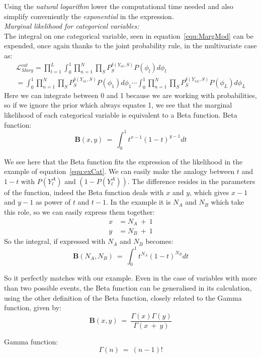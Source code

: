 \documentclass[twocolumn]{article}
\begin{document}
Using the \emph{natural logarithm} lower the computational time needed and also simplify conveniently the \emph{exponential} in the expression.\\
\emph{Marginal likelihood for categorical variables:}\\
The integral on one categorical variable, seen in equation~\ref{equ:MargMod} can be expended, once again thanks to the joint probability rule, in the multivariate case as:
\begin{align}
    \mathcal{L}_{Marg}^{cat} = \prod_{l=1}^L\int_0^1\prod_{n=1}^N\prod_SP_{S}^{\delta(Y_{nl},S)}P(\phi_l)d\phi_l\nonumber\\
    = \int_0^1\prod_{n=1}^N\prod_SP_{S}^{\delta(Y_{n1},S)}P(\phi_1)d\phi_1\cdots\int_0^1\prod_{n=1}^N\prod_SP_{S}^{\delta(Y_{nL},S)}P(\phi_L)d\phi_L
    \label{equ:LmargCat}
\end{align}
Here we can integrate between 0 and 1 because we are working with probabilities, so if we ignore the prior which always equates 1, we see that the marginal likelihood of each categorical variable is equivalent to a Beta function.
Beta function:\\
$$\textbf{B}(x,y)\ =\ \int_0^1t^{x-1}(1-t)^{y-1}dt$$


We see here that the Beta function fits the expression of the likelihood in the example of equation~\ref{equ:exCat}.
We can easily make the analogy between $t$ and $1-t$ with $P(Y_{l}^A)$ and $(1-P(Y_{l}^A))$.
The difference resides in the parameters of the function, indeed the Beta function deals with $x$ and $y$, which gives $x-1$ and $y-1$ as power of $t$ and $t-1$. In the example it is $N_A$ and $N_B$ which take this role, so we can easily express them together:
\begin{align}
    x &= N_A\ +\ 1\\
    y &= N_B\ +\ 1
\end{align}
So the integral, if expressed with $N_A$ and $N_B$ becomes:\\
$$\textbf{B}(N_A,N_B)\ =\ \int_0^1t^{N_A}(1-t)^{N_B}dt$$


So it perfectly matches with our example. Even in the case of variables with more than two possible events, the Beta function can be generalised in its calculation, using the other definition of the Beta function, closely related to the Gamma function, given by:\\
$$\textbf{B}(x,y)\ =\ \frac{\Gamma(x)\Gamma(y)}{\Gamma(x\ +\ y)}$$


Gamma function:\\
$$\Gamma(n)\ =\ (n-1)!$$
\end{document}

